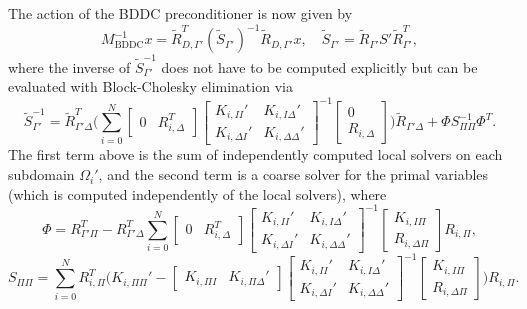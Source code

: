 The action of the BDDC preconditioner is now given by 
\[M^{-1}_{\text{BDDC}}x = \widetilde R^T_{D, \Gamma'}(\widetilde S_{\Gamma'})^{-1}\widetilde R_{D, \Gamma'}x,\quad \widetilde S_{\Gamma'} = \widetilde R_{\Gamma'} S' \widetilde R_{\Gamma'}^T,\]
where the inverse of $\widetilde S^{-1}_{\Gamma'}$ does not have to be computed explicitly but can be evaluated with Block-Cholesky elimination via
\[\widetilde S^{-1}_{\Gamma'} = \widetilde R^T_{\Gamma' \Delta} \big( \sum_{i = 0}^N \begin{bmatrix} 0 & R^T_{i, \Delta} \end{bmatrix}\begin{bmatrix} K_{i, II}' & K_{i, I\Delta}' \\ K_{i, \Delta I}' & K_{i, \Delta \Delta}'\end{bmatrix}^{-1}\begin{bmatrix}0 \\ R_{i, \Delta}\end{bmatrix} \big) \widetilde R_{\Gamma'\Delta} + \Phi S_{\Pi\Pi}^{-1}\Phi^T.\]
The first term above is the sum of independently computed local solvers on each subdomain $\Omega_i'$, and the second term is a coarse solver for the primal variables (which is computed independently of the local solvers), where
\[\Phi = R^T_{\Gamma'\Pi} - R^T_{\Gamma'\Delta}\sum_{i = 0}^N\begin{bmatrix} 0 & R^T_{i, \Delta} \end{bmatrix}\begin{bmatrix} K_{i, II}' & K_{i, I\Delta}' \\ K_{i, \Delta I}' & K_{i, \Delta \Delta}'\end{bmatrix}^{-1}\begin{bmatrix}K_{i,I\Pi} \\ R_{i, \Delta\Pi}\end{bmatrix}R_{i,\Pi},\]
\[S_{\Pi\Pi} = \sum_{i=0}^N R_{i,\Pi}^T\big(K_{i, \Pi\Pi}' - \begin{bmatrix} K_{i,\Pi I} & K_{i,\Pi\Delta}' \end{bmatrix}\begin{bmatrix} K_{i, II}' & K_{i, I\Delta}' \\ K_{i, \Delta I}' & K_{i, \Delta \Delta}'\end{bmatrix}^{-1}\begin{bmatrix}K_{i,I\Pi} \\ R_{i, \Delta\Pi}\end{bmatrix}\big)R_{i,\Pi}.\]

